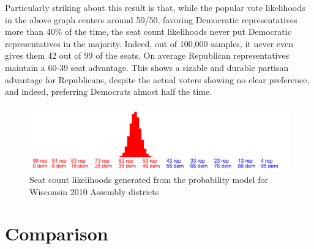 \documentclass[preprint,12pt]{article}
\begin{document}
Particularly striking about this result is that, while the popular vote likelihoods in the above graph centers around 50/50, favoring Democratic representatives more than 40\% of the time, the seat count likelihoods never put Democratic representatives in the majority.  Indeed, out of 100,000 samples, it never even gives them 42 out of 99 of the seats.  On average Republican representatives maintain a 60-39 seat advantage.   This shows a sizable and durable partisan advantage for Republicans, despite the actual voters showing no clear preference, and indeed, preferring Democrats almost half the time.

\begin{figure}[htb!]
    \begin{center}
        \includegraphics[scale=0.3]{../Figures/WI2010/seats_cropped.png}
        \caption{Seat count likelihoods generated from the probability model for Wisconsin 2010 Assembly districts}\label{fig:LikelihoodsSeatCounts}
    \end{center}
\end{figure}
 
\section{Comparison}
\end{document}
